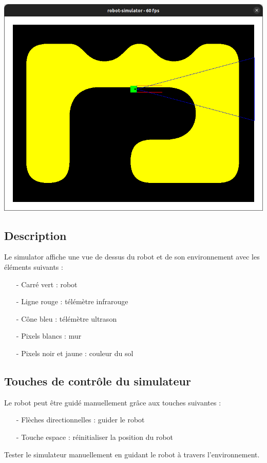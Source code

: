 \documentclass{report}
\begin{document}
\begin{center}
    \includegraphics[width=0.7\linewidth]{img/simu.png}
\end{center}

\subsection{Description}

Le simulator affiche une vue de dessus du robot et de son environnement avec les éléments suivants :
\begin{itemize}
    \item[-] Carré vert : robot
    \item[-] Ligne rouge : télémètre infrarouge
    \item[-] Cône bleu : télémètre ultrason
    \item[-] Pixels blancs : mur
    \item[-] Pixels noir et jaune : couleur du sol
\end{itemize}

\subsection{Touches de contrôle du simulateur}

Le robot peut être guidé manuellement grâce aux touches suivantes :
\begin{itemize}
    \item[-] Flèches directionnelles : guider le robot
    \item[-] Touche espace : réinitialiser la position du robot
\end{itemize}

\begin{itemize}
    \step Tester le simulateur manuellement en guidant le robot à travers l'environnement.
\end{itemize}
\end{document}
